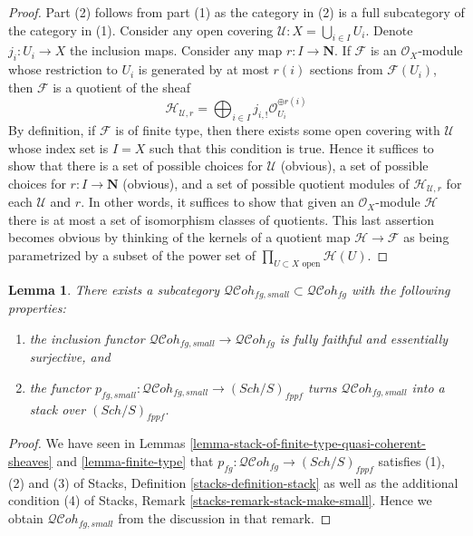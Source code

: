 \documentclass{stacks-project}
\theoremstyle{plain}
\newtheorem{lemma}[subsection]{Lemma}
\theoremstyle{definition}
\theoremstyle{remark}
\numberwithin{equation}{subsection}
\def\Sch{\mathit{Sch}}
\def\QCohstack{\mathcal{QC}\!\mathit{oh}}
\begin{document}
\begin{proof}
Part (2) follows from part (1) as the category in (2) is a full subcategory
of the category in (1). Consider any open covering
$\mathcal{U} : X = \bigcup_{i \in I} U_i$. Denote $j_i : U_i \to X$
the inclusion maps. Consider any map $r : I \to \mathbf{N}$.
If $\mathcal{F}$ is an $\mathcal{O}_X$-module whose restriction to
$U_i$ is generated by at most $r(i)$ sections from $\mathcal{F}(U_i)$,
then $\mathcal{F}$ is a quotient of the sheaf
$$
\mathcal{H}_{\mathcal{U}, r} =
\bigoplus\nolimits_{i \in I} j_{i, !}\mathcal{O}_{U_i}^{\oplus r(i)}
$$
By definition, if $\mathcal{F}$ is of finite type, then there exists
some open covering with $\mathcal{U}$ whose index set is $I = X$
such that this condition is true. Hence it suffices to show that
there is a set of possible choices for $\mathcal{U}$ (obvious),
a set of possible choices for $r : I \to \mathbf{N}$ (obvious), and
a set of possible quotient modules of $\mathcal{H}_{\mathcal{U}, r}$
for each $\mathcal{U}$ and $r$. In other words, it suffices to show
that given an $\mathcal{O}_X$-module $\mathcal{H}$ there is at most
a set of isomorphism classes of quotients.
This last assertion becomes obvious
by thinking of the kernels of a quotient map
$\mathcal{H} \to \mathcal{F}$
as being parametrized by a subset of the power set of
$\prod_{U \subset X\text{ open}} \mathcal{H}(U)$.
\end{proof}

\begin{lemma}
\label{lemma-stack-fg-quasi-coherent}
There exists a subcategory
$\QCohstack_{fg, small} \subset \QCohstack_{fg}$
with the following properties:
\begin{enumerate}
\item the inclusion functor
$\QCohstack_{fg, small} \to \QCohstack_{fg}$ is
fully faithful and essentially surjective, and
\item the functor
$p_{fg, small} : \QCohstack_{fg, small} \to (\Sch/S)_{fppf}$
turns $\QCohstack_{fg, small}$ into a stack over $(\Sch/S)_{fppf}$.
\end{enumerate}
\end{lemma}

\begin{proof}
We have seen in
Lemmas \ref{lemma-stack-of-finite-type-quasi-coherent-sheaves} and
\ref{lemma-finite-type}
that $p_{fg} : \QCohstack_{fg} \to (\Sch/S)_{fppf}$
satisfies (1), (2) and (3) of
Stacks, Definition \ref{stacks-definition-stack}
as well as the additional condition (4) of
Stacks, Remark \ref{stacks-remark-stack-make-small}.
Hence we obtain $\QCohstack_{fg, small}$ from the discussion
in that remark.
\end{proof}
\end{document}
